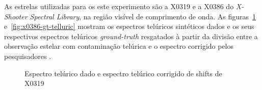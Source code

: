 As estrelas utilizadas para os este experimento são a X0319 e a X0386 do \textit{X-Shooter Spectral Library}, na região visível de comprimento de onda. As figuras~\ref{fig:x0319-gt-telluric} e~\ref{fig:x0386-gt-telluric} mostram os espectros telúricos sintéticos dados e os seus respectivos espectros telúricos \textit{ground-truth} resgatados à partir da divisão entre a observação estelar com contaminação telúrica e o espectro corrigido pelos pesquisadores \citep{unpublished-xshooter-data-release}.

\begin{figure}[htb]
  \centering
  \hfill
  \caption{Espectro telúrico dado e espectro telúrico corrigido de shifts de X0319}
  \label{fig:x0319-gt-telluric}
\end{figure}

